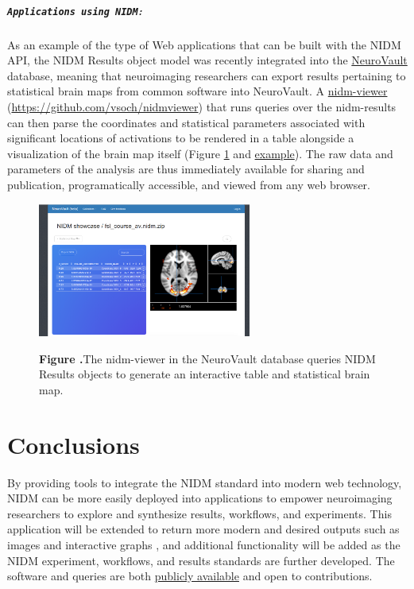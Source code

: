 \documentclass[twocolumn]{bmcart}%
\begin{document}
\subparagraph{\texorpdfstring{\texttt{Applications using NIDM}:}{:}}\label{section}
As an example of the type of Web applications that can be built with the NIDM API, the NIDM Results object model \cite{noauthor_undated-if} was recently integrated into the \href{http://www.neurovault.org}{NeuroVault} database, meaning that neuroimaging researchers can export results pertaining to statistical brain maps from common software \cite{Jenkinson2012-pr} into NeuroVault. A \href{https://github.com/vsoch/nidmviewer}{nidm-viewer} (\href{https://github.com/vsoch/nidmviewer}{https://github.com/vsoch/nidmviewer}) that runs queries over the nidm-results can then parse the coordinates and statistical parameters associated with significant locations of activations to be rendered in a table alongside a visualization of the brain map itself (Figure \ref{fig:02} and \href{http://neurovault.org/collections/877/fsl_course_av.nidm}{example}). The raw data and parameters of the analysis are thus immediately available for sharing and publication, programatically accessible, and viewed from any web browser. 

\begin{figure}[h!]
\begin{center}
\includegraphics[width=7cm]{img/figure2}
\end{center}
 \textbf{\label{fig:02}Figure .}{The nidm-viewer in the NeuroVault database queries NIDM Results objects to generate an interactive table and statistical brain map.}
\end{figure}

\section{Conclusions}\label{conclusions}

By providing tools to integrate the NIDM standard into modern web technology, NIDM can be more easily deployed into applications to empower neuroimaging researchers to explore and synthesize results, workflows, and experiments. This application will be extended to return more modern and desired outputs such as images and interactive graphs \cite{noauthor_undated-fs}, and additional functionality will be added as the NIDM experiment, workflows, and results standards are further developed. The software and queries are both \href{https://github.com/incf-nidash}{publicly available} and open to contributions.
\end{document}
